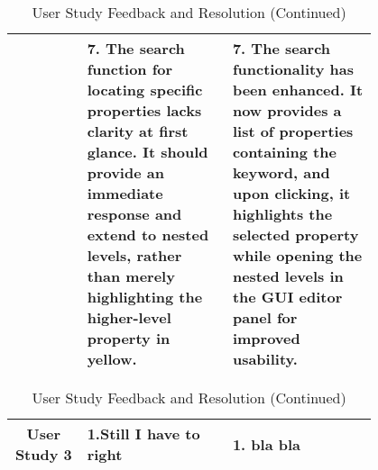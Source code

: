 \begin{table*}
\begin{tabular}{|c|p{0.4\linewidth}|p{0.4\linewidth}|}
        \cline{2-3}
        & 7. The search function for locating specific properties lacks clarity at first glance. It should provide an immediate response and extend to nested levels, rather than merely highlighting the higher-level property in yellow. & 7. The search functionality has been enhanced. It now provides a list of properties containing the keyword, and upon clicking, it highlights the selected property while opening the nested levels in the GUI editor panel for improved usability. \\
        \hline
    \end{tabular}
    \caption*{User Study Feedback and Resolution (Continued)}
\end{table*}

\begin{table*}
    \centering
    \small %
    \setlength{\extrarowheight}{5pt} %
    \renewcommand{\arraystretch}{1.5} %
    \begin{tabular}{|c|p{0.4\linewidth}|p{0.4\linewidth}|}
        \hline
        User Study 3 & 1.Still I have to right & 1. bla bla \\
        \cline{2-3}

        \hline
    \end{tabular}
    \caption*{User Study Feedback and Resolution (Continued)}
\end{table*}

